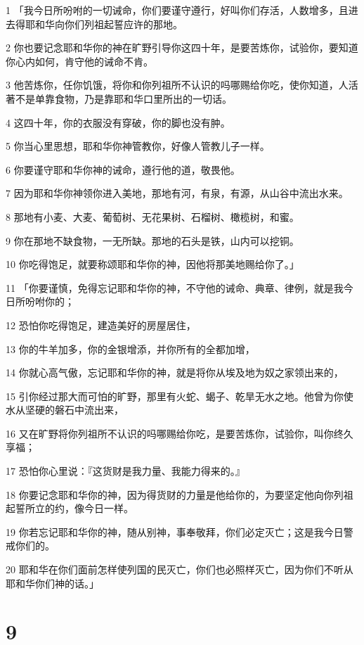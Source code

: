 \par 1 「我今日所吩咐的一切诫命，你们要谨守遵行，好叫你们存活，人数增多，且进去得耶和华向你们列祖起誓应许的那地。
\par 2 你也要记念耶和华你的神在旷野引导你这四十年，是要苦炼你，试验你，要知道你心内如何，肯守他的诫命不肯。
\par 3 他苦炼你，任你饥饿，将你和你列祖所不认识的吗哪赐给你吃，使你知道，人活著不是单靠食物，乃是靠耶和华口里所出的一切话。
\par 4 这四十年，你的衣服没有穿破，你的脚也没有肿。
\par 5 你当心里思想，耶和华你神管教你，好像人管教儿子一样。
\par 6 你要谨守耶和华你神的诫命，遵行他的道，敬畏他。
\par 7 因为耶和华你神领你进入美地，那地有河，有泉，有源，从山谷中流出水来。
\par 8 那地有小麦、大麦、葡萄树、无花果树、石榴树、橄榄树，和蜜。
\par 9 你在那地不缺食物，一无所缺。那地的石头是铁，山内可以挖铜。
\par 10 你吃得饱足，就要称颂耶和华你的神，因他将那美地赐给你了。」
\par 11 「你要谨慎，免得忘记耶和华你的神，不守他的诫命、典章、律例，就是我今日所吩咐你的；
\par 12 恐怕你吃得饱足，建造美好的房屋居住，
\par 13 你的牛羊加多，你的金银增添，并你所有的全都加增，
\par 14 你就心高气傲，忘记耶和华你的神，就是将你从埃及地为奴之家领出来的，
\par 15 引你经过那大而可怕的旷野，那里有火蛇、蝎子、乾旱无水之地。他曾为你使水从坚硬的磐石中流出来，
\par 16 又在旷野将你列祖所不认识的吗哪赐给你吃，是要苦炼你，试验你，叫你终久享福；
\par 17 恐怕你心里说：『这货财是我力量、我能力得来的。』
\par 18 你要记念耶和华你的神，因为得货财的力量是他给你的，为要坚定他向你列祖起誓所立的约，像今日一样。
\par 19 你若忘记耶和华你的神，随从别神，事奉敬拜，你们必定灭亡；这是我今日警戒你们的。
\par 20 耶和华在你们面前怎样使列国的民灭亡，你们也必照样灭亡，因为你们不听从耶和华你们神的话。」

\chapter{9}

